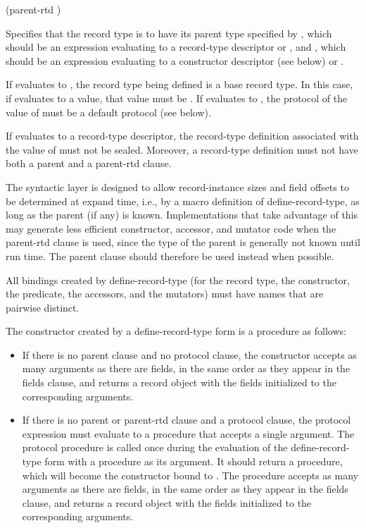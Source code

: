 \begin{entry}
{\cf (parent-rtd  )}

Specifies that the record type is to have its parent type specified by
, which should be an expression evaluating to a
record-type descriptor or \schfalse, and , which should be an
expression evaluating to a constructor descriptor (see below) or
\schfalse.

If  evaluates to \schfalse, the record type being
defined is a base record type.  In this case, if 
evaluates to a value, that value must be \schfalse.  If  evaluates to \schfalse{}, the protocol of the value of
 must be a default protocol (see below).

If  evaluates to a record-type descriptor, the
record-type definition associated with the value of 
must not be sealed.  Moreover, a record-type definition must not have
both a {\cf parent} and a {\cf parent-rtd} clause.

\begin{note}
  The syntactic layer is designed to allow record-instance sizes and field
  offsets to be determined at expand time, i.e., by a macro definition of
  {\cf define-record-type}, as long as the parent (if any) is known.
  Implementations that take advantage of this may generate less
  efficient constructor, accessor, and mutator code when the
  {\cf parent-rtd} clause is used, since the type of the parent is
  generally not known until run time.
  The {\cf parent} clause should therefore be used instead when possible.
\end{note}

All bindings created by {\cf define-record-type} (for the record type,
the constructor, the predicate, the accessors, and the
mutators) must have names that are pairwise distinct.

The constructor created by a {\cf define-record-type} form is a
procedure as follows:
%
\begin{itemize}
\item If there is no {\cf parent} clause and no {\cf protocol} clause,
  the constructor accepts as many arguments as there are fields, in
  the same order as they appear in the {\cf fields} clause, and
  returns a record object with the fields initialized to the
  corresponding arguments.
\item If there is no {\cf parent} or {\cf parent-rtd} clause and a
  {\cf protocol} clause,
  the protocol expression must evaluate to a procedure that accepts a
  single argument.  The protocol procedure is called once during the
  evaluation of the {\cf define-record-type} form with a
  procedure  as its argument.  It should return a procedure,
  which will become the constructor bound to .
  The procedure  accepts as many arguments as there are fields,
  in the same order as they appear in the {\cf fields} clause, and
  returns a record object with the fields initialized to the
  corresponding arguments.


\end{itemize}
\end{entry}
